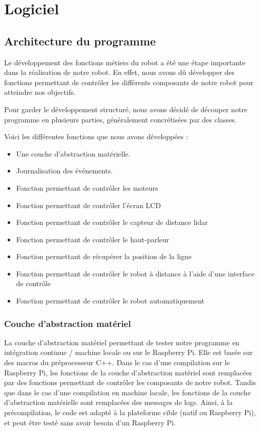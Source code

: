 \section{Logiciel}

\subsection{Architecture du programme}

Le développement des fonctions métiers du robot a été une étape importante dans la réalisation de notre robot.
En effet, nous avons dû développer des fonctions permettant de contrôler les différents composants de notre robot pour atteindre nos objectifs.

Pour garder le développement structuré, nous avons décidé de découper notre programme en plusieurs parties, généralement concrétisées par des classes.

Voici les différentes fonctions que nous avons développées :
\begin{itemize}
    \item Une couche d'abstraction matérielle.
    \item Journalisation des événements.
    \item Fonction permettant de contrôler les moteurs
    \item Fonction permettant de contrôler l'écran LCD
    \item Fonction permettant de contrôler le capteur de distance lidar
    \item Fonction permettant de contrôler le haut-parleur
    \item Fonction permettant de récupérer la position de la ligne
    \item Fonction permettant de contrôler le robot à distance à l'aide d'une interface de contrôle
    \item Fonction permettant de contrôler le robot automatiquement
\end{itemize}

\subsubsection{Couche d'abstraction matériel}

La couche d'abstraction matériel permettant de tester notre programme en intégration continue / machine locale ou sur le Raspberry Pi. 
Elle est basée sur des macros du préprocesseur C++.
Dans le cas d'une compilation sur le Raspberry Pi, les fonctions de la couche d'abstraction matériel sont remplacées par des fonctions permettant de contrôler les composants de notre robot.
Tandis que dans le cas d'une compilation en machine locale, les fonctions de la couche d'abstraction matérielle sont remplacées des messages de logs.
Ainsi, à la précompilation, le code est adapté à la plateforme cible (natif ou Raspberry Pi), et peut être testé sans avoir besoin d'un Raspberry Pi.

